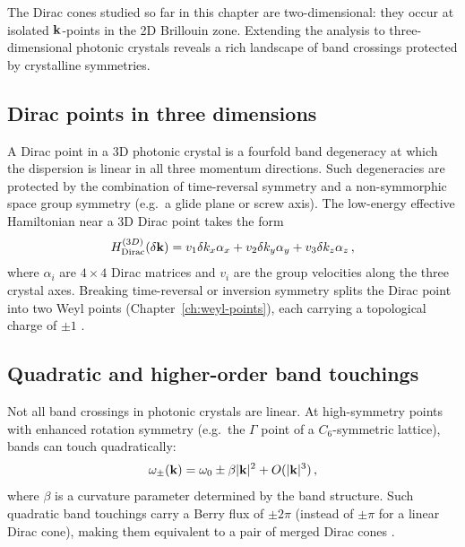 The Dirac cones studied so far in this chapter are two-dimensional:
they occur at isolated $\mathbf{k}$-points in the 2D Brillouin zone.
Extending the analysis to three-dimensional photonic crystals reveals
a rich landscape of band crossings protected by crystalline
symmetries.

\subsection{Dirac points in three dimensions}
\label{sec:ch6-3d-dirac}

A Dirac point in a 3D photonic crystal is a fourfold band degeneracy
at which the dispersion is linear in all three momentum directions.
Such degeneracies are protected by the combination of time-reversal
symmetry and a non-symmorphic space group symmetry (e.g.\ a glide
plane or screw axis).  The low-energy effective Hamiltonian near a
3D Dirac point takes the form
\begin{equation}\label{eq:ch6-3d-dirac-hamiltonian}
  H_{\mathrm{Dirac}}^{(3D)}(\delta\mathbf{k}) =
  v_1 \delta k_x \alpha_x + v_2 \delta k_y \alpha_y
  + v_3 \delta k_z \alpha_z\,,
\end{equation}
where $\alpha_i$ are $4\times 4$ Dirac matrices and $v_i$ are the
group velocities along the three crystal axes.  Breaking time-reversal
or inversion symmetry splits the Dirac point into two Weyl points
(Chapter~\ref{ch:weyl-points}), each carrying a topological charge
of $\pm 1$ \cite{lu2019experimental,ozawa2018topological}.

\subsection{Quadratic and higher-order band touchings}
\label{sec:ch6-quadratic-touching}

Not all band crossings in photonic crystals are linear.  At
high-symmetry points with enhanced rotation symmetry (e.g.\ the
$\Gamma$ point of a $C_6$-symmetric lattice), bands can touch
quadratically:
\begin{equation}\label{eq:ch6-quadratic-dispersion}
  \omega_\pm(\mathbf{k}) = \omega_0 \pm \beta |\mathbf{k}|^2 + O(|\mathbf{k}|^3)\,,
\end{equation}
where $\beta$ is a curvature parameter determined by the band
structure.  Such quadratic band touchings carry a Berry flux of
$\pm 2\pi$ (instead of $\pm\pi$ for a linear Dirac cone), making
them equivalent to a pair of merged Dirac cones
\cite{wu2015scheme,ozawa2018topological}.

